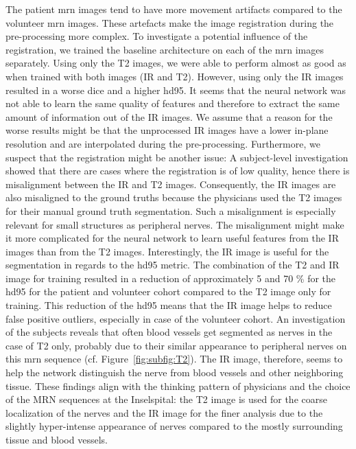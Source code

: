The patient \gls{mrn} images tend to have more movement artifacts compared to the volunteer \gls{mrn} images. These artefacts make the image registration during the pre-processing more complex. To investigate a potential influence of the registration, we trained the baseline architecture on each of the \gls{mrn} images separately. Using only the T2 images, we were able to perform almost as good as when trained with both images (IR and T2). However, using only the IR images resulted in a worse \acrlong{dice} and a higher \acrlong{hd95}. It seems that the neural network was not able to learn the same quality of features and therefore to extract the same amount of information out of the IR images. We assume that a reason for the worse results might be that the unprocessed IR images have a lower in-plane resolution and are interpolated during the pre-processing. Furthermore, we suspect that the registration might be another issue: A subject-level investigation showed that there are cases where the registration is of low quality, hence there is misalignment between the IR and T2 images. Consequently, the IR images are also misaligned to the ground truths because the physicians used the T2 images for their manual ground truth segmentation. Such a misalignment is especially relevant for small structures as peripheral nerves. The misalignment might make it more complicated for the neural network to learn useful features from the IR images than from the T2 images. Interestingly, the IR image is useful for the segmentation in regards to the \gls{hd95} metric. The combination of the T2 and IR image for training resulted in a reduction of approximately 5 and 70 \% for the \acrlong{hd95} for the patient and volunteer cohort compared to the T2 image only for training. This reduction of the \gls{hd95} means that the IR image helps to reduce false positive outliers, especially in case of the volunteer cohort. An investigation of the subjects reveals that often blood vessels get segmented as nerves in the case of T2 only, probably due to their similar appearance to peripheral nerves on this \gls{mrn} sequence (cf. Figure~\ref{fig:subfig:T2}). The IR image, therefore, seems to help the network distinguish the nerve from blood vessels and other neighboring tissue. These findings align with the thinking pattern of physicians and the choice of the MRN sequences at the Inselspital: the T2 image is used for the coarse localization of the nerves and the IR image for the finer analysis due to the slightly hyper-intense appearance of nerves compared to the mostly surrounding tissue and blood vessels.

